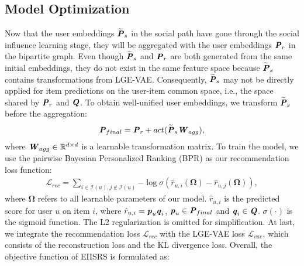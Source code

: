 \documentclass[letterpaper]{article} %
\begin{document}
\subsection{Model Optimization}
Now that the user embeddings $\widetilde{\textbf{\textit{P}}}_{s}$ in the social path have gone through the social influence learning stage, they will be aggregated with the user embeddings $\textbf{\textit{P}}_{r}$ in the bipartite graph. Even though $\widetilde{\textbf{\textit{P}}}_{s}$ and $\textbf{\textit{P}}_{r}$ are both generated from the same initial embeddings, they do not exist in the same feature space because $\widetilde{\textbf{\textit{P}}}_{s}$ contains transformations from LGE-VAE. Consequently, $\widetilde{\textbf{\textit{P}}}_{s}$ may not be directly applied for item predictions on the user-item common space, i.e., the space shared by $\textbf{\textit{P}}_{r}$ and $\textbf{\textit{Q}}$. To obtain well-unified user embeddings, we transform $\widetilde{\textbf{\textit{P}}}_{s}$ before the aggregation:
\begin{align}
    \textbf{\textit{P}}_{final} = \textbf{\textit{P}}_{r} + act(\widetilde{\textbf{\textit{P}}}_{s}\textbf{\textit{W}}_{agg}),
\end{align}
where $\textbf{\textit{W}}_{agg} \in \mathbb{R}^{d\times d}$ is a learnable transformation matrix. To train the model, we use the pairwise Bayesian Personalized Ranking (BPR) \cite{bpr} as our recommendation loss function: 
\begin{align}
    \mathcal{L}_{rec} = \sum_{i\in \mathcal{I}(u), j\notin \mathcal{I}(u)}{-\log \sigma(\hat{r}_{u,i}(\boldsymbol{\Omega})-\hat{r}_{u,j}(\boldsymbol{\Omega}))},
\end{align}
where $\boldsymbol{\Omega}$ refers to all learnable parameters of our model. $\hat{r}_{u,i}$ is the predicted score for user $u$ on item $i$, where $\hat{r}_{u,i}=\textbf{\textit{p}}_u \textbf{\textit{q}}_i$, $\textbf{\textit{p}}_u \in \textbf{\textit{P}}_{final}$ and $\textbf{\textit{q}}_i \in \textbf{\textit{Q}}$. $\sigma(\cdot)$ is the sigmoid function. The L2 regularization is omitted for simplification. At last, we integrate the recommendation loss $\mathcal{L}_{rec}$ with the LGE-VAE loss $\mathcal{L}_{vae}$, which consists of the reconstruction loss and the KL divergence loss. Overall, the objective function of EIISRS is formulated as:
\end{document}
